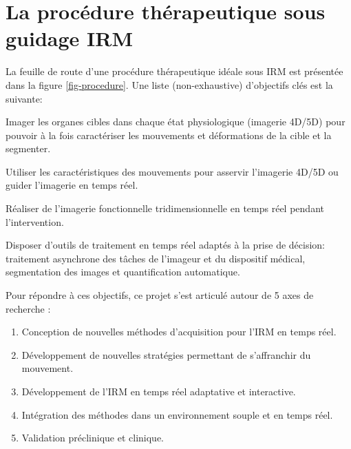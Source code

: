 \documentclass[10pt,a4paper]{report}
\begin{document}
\section{La procédure thérapeutique sous guidage IRM}

La feuille de route d’une procédure thérapeutique idéale sous IRM est présentée dans la figure \ref{fig-procedure}. Une liste (non-exhaustive) d’objectifs clés est la suivante:



\begin{description}
\item Imager les organes cibles dans chaque état physiologique (imagerie 4D/5D) pour pouvoir à la fois caractériser les mouvements et déformations de la cible et la segmenter.
\item  Utiliser les caractéristiques des mouvements pour asservir l’imagerie 4D/5D ou guider l’imagerie en temps réel.
\item  Réaliser de l’imagerie fonctionnelle tridimensionnelle en temps réel pendant l’intervention.
\item  Disposer d’outils de traitement en temps réel adaptés à la prise de décision: traitement asynchrone des tâches de l’imageur et du dispositif médical, segmentation des images et quantification automatique.
\end{description}

Pour répondre à ces objectifs, ce projet s’est articulé autour de 5 axes de recherche :

\begin{enumerate} 
\item Conception de nouvelles méthodes d’acquisition pour l’IRM en temps réel.
\item Développement de nouvelles stratégies permettant de s’affranchir du mouvement.
\item Développement de l’IRM en temps réel adaptative et interactive.
\item Intégration des méthodes dans un environnement souple et en temps réel.
\item Validation préclinique et clinique.
\end{enumerate}
\end{document}
